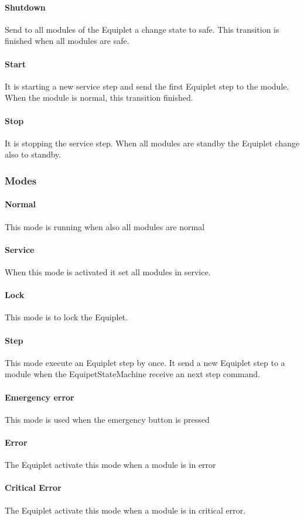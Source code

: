 \documentclass[12pt,a4paper]{report}
\begin{document}
\paragraph{Shutdown}Send to all modules of the Equiplet a change state to safe. This transition is finished when all modules are safe.
\paragraph{Start}It is starting a new service step and send the first Equiplet step to the module. When the module is normal, this transition finished.
\paragraph{Stop}It is stopping the service step. When all modules are standby the Equiplet change also to standby.

\subsubsection{Modes}
\paragraph{Normal}This mode is running when also all modules are normal
\paragraph{Service}When this mode is activated it set all modules in service.
\paragraph{Lock}This mode is to lock the Equiplet.
\paragraph{Step}This mode execute an Equiplet step by once. It send a new Equiplet step to a module when the EquipetStateMachine receive an next step command.
\paragraph{Emergency error}This mode is used when the emergency button is pressed
\paragraph{Error}The Equiplet activate this mode when a module is in error
\paragraph{Critical Error}The Equiplet activate this mode when a module is in critical error.
\end{document}
